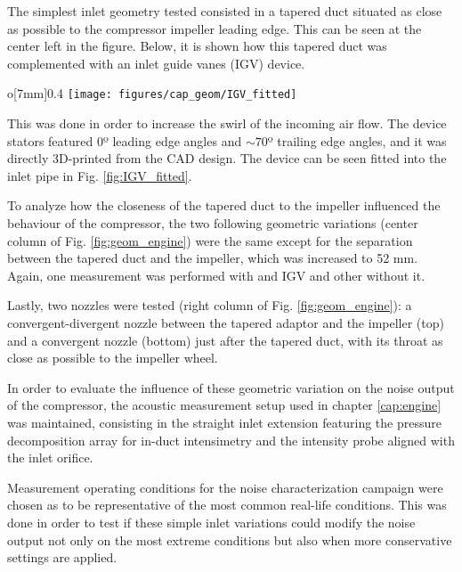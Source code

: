 The simplest inlet geometry tested consisted in a tapered duct situated as close as possible to the compressor impeller leading edge. This can be seen at the center left in the figure. Below, it is shown how this tapered duct was complemented with an inlet guide vanes (IGV) device.

\begin{wrapfigure}{o}[7mm]{0.4\textwidth}
\centering
\texttt{[image: figures/cap\_geom/IGV\_fitted]}
\caption{Picture of the 3D-printed IGV device fitted to the compressor inlet duct, looking towards the impeller.}
\label{fig:IGV_fitted}
\end{wrapfigure}

This was done in order to increase the swirl of the incoming air flow. The device stators featured 0º leading edge angles and $\sim 70$º trailing edge angles, and it was directly 3D-printed from the CAD design. The device can be seen fitted into the inlet pipe in Fig. \ref{fig:IGV_fitted}.

To analyze how the closeness of the tapered duct to the impeller influenced the behaviour of the compressor, the two following geometric variations (center column of Fig. \ref{fig:geom_engine}) were the same except for the separation between the tapered duct and the impeller, which was increased to 52 mm. Again, one measurement was performed with and IGV and other without it.

Lastly, two nozzles were tested (right column of Fig. \ref{fig:geom_engine}): a convergent-divergent nozzle between the tapered adaptor and the impeller (top) and a convergent nozzle (bottom) just after the tapered duct, with its throat as close as possible to the impeller wheel.

In order to evaluate the influence of these geometric variation on the noise output of the compressor, the acoustic measurement setup used in chapter \ref{cap:engine} was maintained, consisting in the straight inlet extension featuring the pressure decomposition array for in-duct intensimetry and the intensity probe aligned with the inlet orifice.

Measurement operating conditions for the noise characterization campaign were chosen as to be representative of the most common real-life conditions. This was done in order to test if these simple inlet variations could modify the noise output not only on the most extreme conditions but also when more conservative settings are applied.

